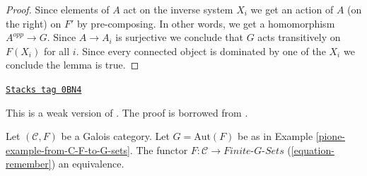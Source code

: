 \begin{proof}
\medskip\noindent
Since elements of $A$ act on the inverse system $X_i$ we get an action of
$A$ (on the right) on $F'$ by pre-composing. In other words, we get
a homomorphism $A^{opp} \to G$. Since $A \to A_i$ is surjective we conclude
that $G$ acts transitively on $F(X_i)$ for all $i$. Since every connected
object is dominated by one of the $X_i$ we conclude the lemma is true.
\end{proof}

\begin{proposition}[Galois]
\label{pione-proposition-galois}
\href{https://stacks.math.columbia.edu/tag/0BN4}{\texttt{Stacks tag 0BN4}}

\begin{reference}
This is a weak version of \cite[Expos\'e V]{SGA1}.
The proof is borrowed from \cite[Theorem 7.2.5]{BS}.
\end{reference}
Let $(\mathcal{C}, F)$ be a Galois category. Let $G = \text{Aut}(F)$
be as in Example \ref{pione-example-from-C-F-to-G-sets}. The functor
$F : \mathcal{C} \to \textit{Finite-}G\textit{-Sets}$
(\ref{equation-remember}) an equivalence.
\end{proposition}

